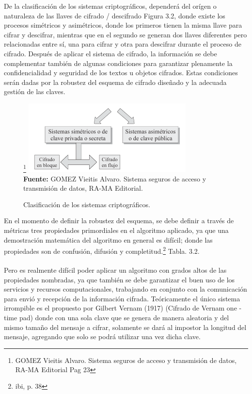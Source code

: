 \documentclass[a4paper,openright,12pt]{book}
\theoremstyle{definition}
\theoremstyle{remark}
\begin{document}
De la clasificación de los sistemas criptográficos, dependerá del orígen o naturaleza de las llaves de cifrado / descifrado Figura 3.2, donde existe los procesos simétricos y asimétricos, donde los primeros tienen la misma llave para cifrar y descifrar, mientras que en el segundo se generan dos llaves diferentes pero relacionadas entre sí, una para cifrar y otra para descifrar durante el proceso de cifrado. Después de aplicar el sistema de cifrado, la información se debe complementar también de algunas condiciones para garantizar plenamente la confidencialidad y seguridad de los textos u objetos cifrados. Estas condiciones serán dadas por la robustez del esquema de cifrado diseñado y la adecuada gestión de las claves.

\begin{figure}[ht]
\centering
\caption{Clasificación de los sistemas criptográficos.}\footnote{GOMEZ Vieitis Alvaro. Sistema seguros de acceso y transmisión de datos, RA-MA Editorial Pag 23}
\includegraphics[scale=0.8]{ClasificacionCripto}
\label{fig:ClasificacionCripto}
\\\textbf{Fuente:} GOMEZ Vieitis Alvaro. Sistema seguros de acceso y transmisión de datos, RA-MA Editorial.
\end{figure}

En el momento de definir la robustez del esquema, se debe definir a través de métricas tres propiedades primordiales en el algoritmo aplicado, ya que una demostración matemática del algoritmo en general es difícil; donde las propiedades son de confusión, difusión y completitud.\footnote{ibi, p. 38} Tabla. 3.2.\\\\
Pero es realmente difícil poder aplicar un algoritmo con grados altos de las propiedades nombradas, ya que también se debe garantizar el buen uso de los servicios y recursos computacionales, trabajando en conjunto con la comunicación para envió y recepción de la información cifrada. Teóricamente el único sistema irrompible es el propuesto por Gilbert Vernam (1917) (Cifrado de Vernam one - time pad) donde con una sola clave que se genera de manera aleatoria y del mismo tamaño del mensaje a cifrar, solamente se dará al impostor la longitud del mensaje, agregando que solo se podrá utilizar una vez dicha clave.
\end{document}
